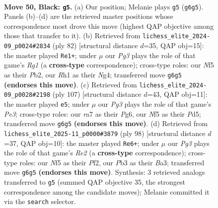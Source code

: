 \documentclass[11pt]{article}
\begin{document}
\clearpage

\begin{figure}[p]\centering
\begin{subfigure}{0.46\textwidth}\centering
\resizebox{\linewidth}{!}{%
\newchessgame
\chessboard[
  setfen={6r1/R7/3pk1p1/5n1p/8/1p6/1R2NKP1/7r b - - 7 50},
  showmover=false,
  pgfstyle=straightmove, color=movearrow, markmove={g6-g5}
]}
\caption{}
\end{subfigure}\hfill
\begin{subfigure}{0.46\textwidth}\centering
\resizebox{\linewidth}{!}{%
\newchessgame
\chessboard[
  setfen={8/3n4/4k3/p7/6N1/PP1r4/KP6/6R1 w - - 6 42},
  showmover=false,
  pgfstyle=straightmove, color=movearrow, markmove={g1-e1}
]}
\caption{}
\end{subfigure}
\\[4pt]
\begin{subfigure}{0.46\textwidth}\centering
\resizebox{\linewidth}{!}{%
\newchessgame
\chessboard[
  setfen={8/5R1p/3kp1p1/3p4/7r/3NPK2/6P1/8 b - - 0 54},
  showmover=false,
  pgfstyle=straightmove, color=movearrow, markmove={e6-e5}
]}
\caption{}
\end{subfigure}\hfill
\begin{subfigure}{0.46\textwidth}\centering
\resizebox{\linewidth}{!}{%
\newchessgame
\chessboard[
  setfen={8/7p/p1k5/3n4/r7/B6P/4RPP1/6K1 w - - 7 50},
  showmover=false,
  pgfstyle=straightmove, color=movearrow, markmove={e2-e6}
]}
\caption{}
\end{subfigure}
\caption{\textbf{Move 50, Black: \texttt{g5}.} (a) Our position; Melanie plays \texttt{g5} (\texttt{g6g5}). Panels (b)--(d) are the retrieved master positions whose correspondence most drove this move (highest QAP objective among those that transfer to it). (b) Retrieved from \texttt{lichess\_elite\_2024-09\_p0024\#2834} (ply 82) [structural distance $d$=35, QAP obj=15]: the master played \texttt{Re1+}; under $\mu$ our \emph{Pg3} plays the role of that game's \emph{Rg1} (a \textbf{cross-type} correspondence); cross-type roles: our \emph{N}f5 as their \emph{P}b2, our \emph{R}h1 as their \emph{N}g4; transferred move \texttt{g6g5} \textbf{(endorses this move)}. (c) Retrieved from \texttt{lichess\_elite\_2024-09\_p0028\#2198} (ply 107) [structural distance $d$=43, QAP obj=11]: the master played \texttt{e5}; under $\mu$ our \emph{Pg3} plays the role of that game's \emph{Pe3}; cross-type roles: our \emph{r}a7 as their \emph{P}g6, our \emph{N}f5 as their \emph{P}d5; transferred move \texttt{g6g5} \textbf{(endorses this move)}. (d) Retrieved from \texttt{lichess\_elite\_2025-11\_p0000\#3879} (ply 98) [structural distance $d$=37, QAP obj=10]: the master played \texttt{Re6+}; under $\mu$ our \emph{Pg3} plays the role of that game's \emph{Re2} (a \textbf{cross-type} correspondence); cross-type roles: our \emph{N}f5 as their \emph{P}f2, our \emph{P}b3 as their \emph{B}a3; transferred move \texttt{g6g5} \textbf{(endorses this move)}. Synthesis: 3 retrieved analogs transferred to \texttt{g5} (summed QAP objective 35, the strongest correspondence among the candidate moves); Melanie committed it via the \texttt{search} selector.}
\label{fig:thought-m99}
\end{figure}
\end{document}
